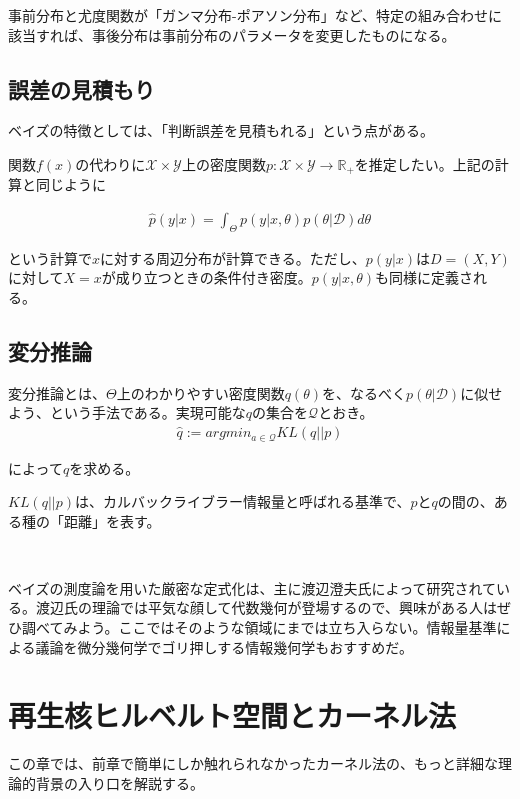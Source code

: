 \documentclass[dvipdfmx, a4paper]{jsarticle}
\begin{document}
事前分布と尤度関数が「ガンマ分布-ポアソン分布」など、特定の組み合わせに該当すれば、事後分布は事前分布のパラメータを変更したものになる。

\subsection{誤差の見積もり}

ベイズの特徴としては、「判断誤差を見積もれる」という点がある。

関数$f(x)$の代わりに$\mathcal{X}\times\mathcal{Y}$上の密度関数$p:\mathcal{X}\times\mathcal{Y}\to\mathbb{R}_+$を推定したい。上記の計算と同じように

\begin{align}
\hat{p}(y|x)=\int_\Theta p(y|x,\theta)p(\theta|\mathcal{D})d\theta
\end{align}

という計算で$x$に対する周辺分布が計算できる。ただし、$p(y|x)$は$D=(X,Y)$に対して$X=x$が成り立つときの条件付き密度。$p(y|x,\theta)$も同様に定義される。

\subsection{変分推論}

変分推論とは、$\Theta$上のわかりやすい密度関数$q(\theta)$を、なるべく$p(\theta|\mathcal{D})$に似せよう、という手法である。実現可能な$q$の集合を$\mathcal{Q}$とおき。
\begin{align}
\hat{q}:=argmin_{a\in\mathcal{Q}}KL(q||p)
\end{align}

によって$q$を求める。

$KL(q||p)$は、カルバックライブラー情報量と呼ばれる基準で、$p$と$q$の間の、ある種の「距離」を表す。

　

ベイズの測度論を用いた厳密な定式化は、主に渡辺澄夫氏によって研究されている。渡辺氏の理論では平気な顔して代数幾何が登場するので、興味がある人はぜひ調べてみよう。ここではそのような領域にまでは立ち入らない。情報量基準による議論を微分幾何学でゴリ押しする情報幾何学もおすすめだ。

\newpage
\section{再生核ヒルベルト空間とカーネル法}
この章では、前章で簡単にしか触れられなかったカーネル法の、もっと詳細な理論的背景の入り口を解説する。
\end{document}
